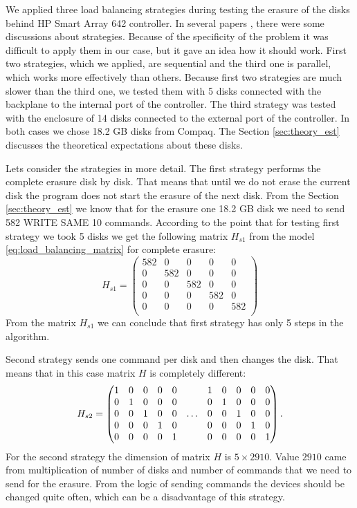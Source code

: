 We applied three load balancing strategies during testing the erasure of the disks behind HP Smart Array 642 controller. In several papers \cite{load_bal_policy}, \cite{diff_policies} there were some discussions about strategies. Because of the specificity of the problem it was difficult to apply them in our case, but it gave an idea how it should work. First two strategies, which we applied, are sequential and the third one is parallel, which works more effectively than others. Because first two strategies are much slower than the third one, we tested them with 5 disks connected with the backplane to the internal port of the controller. The third strategy was tested with the enclosure of 14 disks connected to the external port of the controller. In both cases we chose 18.2 GB disks from Compaq. The Section \ref{sec:theory_est} discusses the theoretical expectations about these disks.

Lets consider the strategies in more detail. The first strategy performs the complete erasure disk by disk. That means that until we do not erase the current disk the program does not start the erasure of the next disk. From the Section \ref{sec:theory_est} we know that for the erasure one 18.2 GB disk we need to send 582 WRITE SAME 10 commands. According to the point that for testing first strategy we took 5 disks we get the following matrix $H_{s1}$ from the model \ref{eq:load_balancing_matrix} for complete erasure:
\begin{equation}
	H_{s1} =
	\begin{pmatrix}
		582 & 0 & 0 & 0 & 0\\
		0 & 582 & 0 & 0 & 0\\
		0 & 0 & 582 & 0 & 0\\
		0 & 0 & 0 & 582 & 0 \\
		0 & 0 & 0 & 0 & 582 \\
	\end{pmatrix}
\end{equation}
From the matrix $H_{s1}$ we can conclude that first strategy has only 5 steps in the algorithm.


Second strategy sends one command per disk and then changes the disk. That means that in this case
matrix $H$ is completely different:
\begin{equation}
\setcounter{MaxMatrixCols}{13}
	H_{s2} =
	\begin{pmatrix}
		1 & 0 & 0 & 0 & 0 &&  		1 & 0 & 0 & 0 & 0 \\
		0 & 1 & 0 & 0 & 0 &&  		0 & 1 & 0 & 0 & 0 \\
		0 & 0 & 1 & 0 & 0 &\ldots&   0 & 0 & 1 & 0 & 0 \\
		0 & 0 & 0 & 1 & 0 &&  		0 & 0 & 0 & 1 & 0 \\
		0 & 0 & 0 & 0 & 1 &&  		0 & 0 & 0 & 0 & 1 \\
	\end{pmatrix}.
\end{equation}
For the second strategy the dimension of matrix $H$ is $5\times2910$. Value $2910$ came from multiplication of number of disks and number of commands that we need to send for the erasure. From the logic of sending commands the devices should be changed quite often, which can be a disadvantage of this strategy. 


